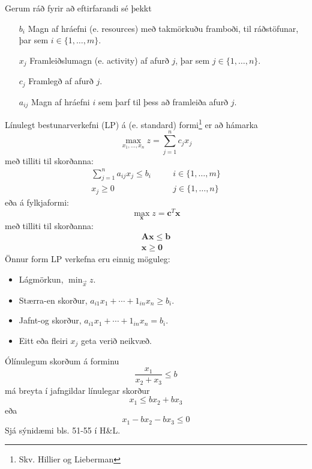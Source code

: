 Gerum ráð fyrir að eftirfarandi sé þekkt
\begin{itemize}
\item[$b_i$] Magn af hráefni (e. resources) með takmörkuðu framboði, til ráðstöfunar, þar sem \mbox{$i\in\{1,\ldots,m\}$}.
\item[$x_j$] Framleiðslumagn (e. activity) af afurð $j$, þar sem \mbox{$j\in\{1,\ldots,n\}$}.
\item[$c_j$] Framlegð af afurð $j$.
\item[$a_{ij}$] Magn af hráefni $i$ sem þarf til þess að framleiða afurð $j$.
\end{itemize}
Línulegt bestunarverkefni (LP) á  (e. standard) formi\footnote{Skv. Hillier og Lieberman} er að hámarka
\begin{equation}
\max_{x_1,\ldots,x_n}  z = \sum_{j=1}^n c_j x_j 
\end{equation}
með tilliti til skorðanna:
\begin{eqnarray}
\sum_{j=1}^n a_{ij} x_j  \le  b_i &\quad& i\in\{1,\ldots,m\} \\
x_j  \ge  0 &\quad&  j\in\{1,\ldots,n\}
\end{eqnarray}
eða á fylkjaformi:
\begin{equation}
 \max_{\mathbf{x}} z = \mathbf{c}^{T}\mathbf{x}
\end{equation}
með tilliti til skorðanna:
\begin{eqnarray}
\mathbf{A}\mathbf{x}  \le  \mathbf{b} \\
\mathbf{x} \ge  \mathbf{0}
\end{eqnarray}
\newpage
Önnur form LP verkefna eru einnig möguleg:
\begin{itemize}
 \item Lágmörkun, $\min_{\vec{x}} z$.
 \item Stærra-en skorður, $a_{i1}x_1+\cdots+1_{in}x_n\geq b_i$.
 \item Jafnt-og skorður,  $a_{i1}x_1+\cdots+1_{in}x_n = b_i$.
 \item Eitt eða fleiri $x_j$ geta verið neikvæð.
\end{itemize}
\begin{aths}
 Ólínulegum skorðum á forminu
$$ \frac{x_1}{x_2+x_3}\leq b$$
má breyta í jafngildar línulegar skorður
$$ x_1 \leq bx_2+bx_3 $$
eða
$$ x_1-bx_2-bx_3 \leq 0$$
Sjá sýnidæmi bls. 51-55 í H\&L.
\end{aths}

